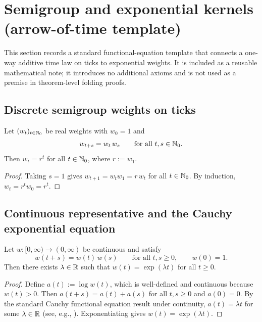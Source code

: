 \section{Semigroup and exponential kernels (arrow-of-time template)}
\label{app:arrow_of_time_semigroup_notes}

\AuditTag This section records a standard functional-equation template that connects a one-way additive time law on ticks to exponential weights.
It is included as a reusable mathematical note; it introduces no additional axioms and is not used as a premise in theorem-level folding proofs.

\subsection{Discrete semigroup weights on ticks}
\label{subsec:arrow_time_discrete_semigroup}

\begin{proposition}\label{prop:discrete_memoryless_exponential}
\MathTag Let $(w_t)_{t\in\mathbb{N}_0}$ be real weights with $w_0=1$ and
\[
w_{t+s}=w_t\,w_s\qquad\text{for all }t,s\in\mathbb{N}_0.
\]
Then $w_t=r^t$ for all $t\in\mathbb{N}_0$, where $r:=w_1$.
\end{proposition}
\begin{proof}
Taking $s=1$ gives $w_{t+1}=w_t w_1=r\,w_t$ for all $t\in\mathbb{N}_0$.
By induction,
$
w_t=r^t w_0=r^t.
$
\end{proof}

\subsection{Continuous representative and the Cauchy exponential equation}
\label{subsec:arrow_time_continuous_exponential}

\begin{proposition}\label{prop:continuous_semigroup_exponential}
\MathTag Let $w:[0,\infty)\to(0,\infty)$ be continuous and satisfy
\[
w(t+s)=w(t)\,w(s)\qquad\text{for all }t,s\ge 0,\qquad w(0)=1.
\]
Then there exists $\lambda\in\mathbb{R}$ such that $w(t)=\exp(\lambda t)$ for all $t\ge 0$.
\end{proposition}
\begin{proof}
Define $a(t):=\log w(t)$, which is well-defined and continuous because $w(t)>0$.
Then $a(t+s)=a(t)+a(s)$ for all $t,s\ge 0$ and $a(0)=0$.
By the standard Cauchy functional equation result under continuity, $a(t)=\lambda t$ for some $\lambda\in\mathbb{R}$ (see, e.g., \cite{AczelDhombres1989FunctionalEquations}).
Exponentiating gives $w(t)=\exp(\lambda t)$.
\end{proof}

